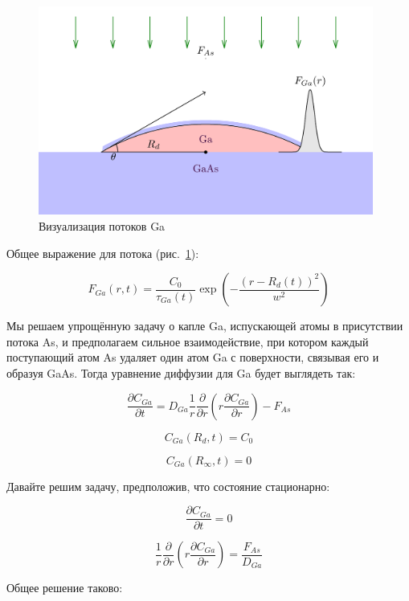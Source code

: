 \documentclass[14pt,oneside]{extarticle}
\begin{document}
\begin{figure}[H]
    \begin{center}
        \includegraphics[width=11cm]{images/first.png}
        \caption{\label{fig:first}
        Визуализация потоков Ga}
    \end{center}
\end{figure}

Общее выражение для потока (рис.~\ref{fig:first}):

\begin{equation}
    F_{Ga}\left(r,t\right)=\frac{C_{0}}{\tau_{Ga}\left(t\right)}\exp\left(-\frac{\left(r-R_{d}\left(t\right)\right)^{2}}{w^{2}}\right)
\end{equation}

Мы решаем упрощённую задачу о капле Ga, испускающей атомы в присутствии потока As, и предполагаем сильное взаимодействие, при котором каждый поступающий атом As удаляет один атом Ga с поверхности, связывая его и образуя GaAs. Тогда уравнение диффузии для Ga будет выглядеть так:

\begin{equation}
    \frac{\partial C_{Ga}}{\partial t}=D_{Ga}\frac{1}{r}\frac{\partial}{\partial r}\left(r\frac{\partial C_{Ga}}{\partial r}\right)-F_{As}
\end{equation}

\[
C_{Ga}\left(R_{d},t\right)=C_{0}
\]

\[
C_{Ga}\left(R_{\infty},t\right)=0
\]

Давайте решим задачу, предположив, что состояние стационарно:

\[
\frac{\partial C_{Ga}}{\partial t}=0
\]

\[
\frac{1}{r}\frac{\partial}{\partial r}\left(r\frac{\partial C_{Ga}}{\partial r}\right)=\frac{F_{As}}{D_{Ga}}
\]

Общее решение таково:
\end{document}
